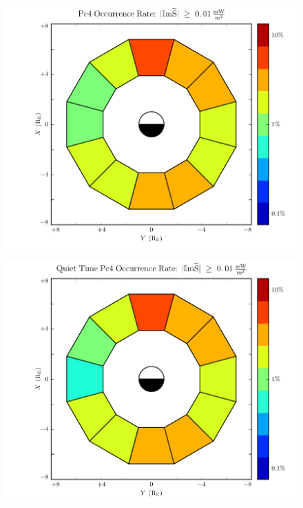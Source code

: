 \begin{figure}[!htb]
    \centering
    \includegraphics[width=\textwidth]{figures/rate_all.pdf}
    \caption[Pc4 Rate]{
      \todo{$\cdots$}
    }
    \label{fig_rate_all}
\end{figure}

\begin{figure}[!htb]
    \centering
    \includegraphics[width=\textwidth]{figures/rate_calm.pdf}
    \caption[Pc4 Rate: Dst $\geq \SI{-30}{\nT}$]{
      \todo{$\cdots$}
    }
    \label{fig_rate_calm}
\end{figure}

